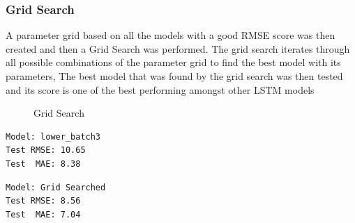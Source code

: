 \documentclass[10pt,11pt,12pt,oneside]{book}
\begin{document}
\subsubsection{Grid Search}
A parameter grid based on all the models with a good RMSE score was then created and then a Grid Search was performed. The grid search iterates through all possible combinations of the parameter grid to find the best model with its parameters, The best model that was found by the grid search was then tested and its score is one of the best performing amongst other LSTM models\\
\begin{figure}[H]
    \centering
    \qquad
    \caption{Grid Search}%
    \label{fig:grid}%
\end{figure}
\begin{multicols}{2}
\centering
\begin{verbatim}
Model: lower_batch3
Test RMSE: 10.65
Test  MAE: 8.38
\end{verbatim}
\begin{verbatim}
Model: Grid Searched
Test RMSE: 8.56
Test  MAE: 7.04
\end{verbatim}
\end{multicols}
\end{document}
